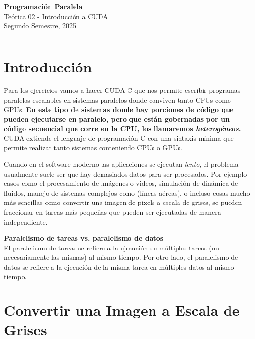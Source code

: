 



\begin{center}
    \LARGE\textbf{Programación Paralela} \\
    \Large{Teórica 02 - Introducción a CUDA} \\
    \normalsize{Segundo Semestre, 2025} \\
    \vspace{1em}
    \hrule
\end{center}

\section*{Introducción}

Para los ejercicios vamos a hacer CUDA C que nos permite escribir programas paralelos escalables en sistemas paralelos
donde conviven tanto CPUs como GPUs. \textbf{En este tipo de sistemas donde hay porciones de código que pueden
ejecutarse en paralelo, pero que están gobernadas por un código secuencial que corre en la CPU, los llamaremos
\textit{heterogéneos}.} CUDA extiende el lenguaje de programación C con una sintaxis mínima que permite realizar tanto
sistemas conteniendo CPUs o GPUs.

Cuando en el software moderno las aplicaciones se ejecutan \textit{lento}, el problema usualmente suele ser que hay
demasiados datos para ser procesados. Por ejemplo casos como el procesamiento de imágenes o videos, simulación de
dinámica de fluidos, manejo de sistemas complejos como (líneas aéreas), o incluso cosas mucho más sencillas como
convertir una imagen de pixels a escala de grises, se pueden fraccionar en tareas más pequeñas que pueden ser ejecutadas
de manera independiente.

\begin{tcolorbox}[colback=yellow,colframe=yellow!75!black,arc=0pt,outer arc=0pt]
  \textbf{Paralelismo de tareas vs. paralelismo de datos} \\

  El paralelismo de tareas se refiere a la ejecución de múltiples tareas (no necesariamente las mismas) al mismo tiempo.
  Por otro lado, el paralelismo de datos se refiere a la ejecución de la misma tarea en múltiples datos al mismo tiempo.
\end{tcolorbox}


\section*{Convertir una Imagen a Escala de Grises}

